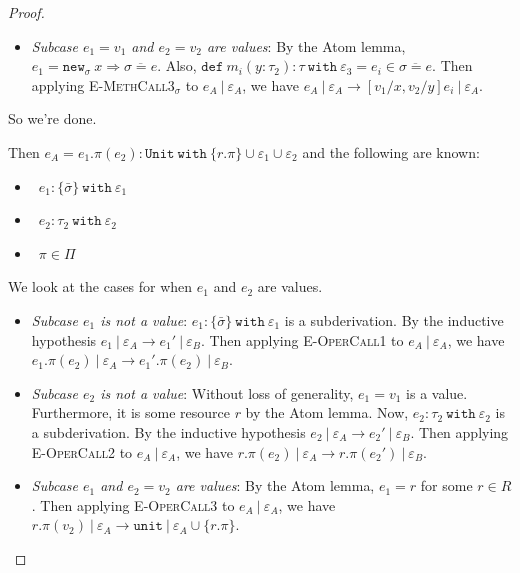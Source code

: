 \documentclass{llncs}
\newcommand{\keywadj}[1]{\mathtt{#1}}
\newcommand{\keyw}[1]{\keywadj{#1}~}
\newcommand{\pcase}[1][]{
  \if\relax\detokenize{#1}\relax
    \def\thiscase{}
  \else
    \def\thiscase{~#1}
  \fi
  \item
}
\begin{document}
\begin{proof}
\begin{pcases}
\begin{itemize}
	\item[] \textit{Subcase $e_1 = v_1$ and $e_2 = v_2$ are values}: By the Atom lemma, $e_1 = \keywadj{new}_{\sigma}~x \Rightarrow \overline{\sigma = e}$. Also, $\keyw{def} m_i(y: \tau_2) : \tau~\keyw{with} \varepsilon_3 = e_i \in \overline{ \sigma = e }$. Then applying \textsc{E-MethCall3$_{\sigma}$} to $e_A~|~\varepsilon_A$, we have $e_A~|~\varepsilon_A \longrightarrow [v_1/x, v_2/y]e_i~|~\varepsilon_A$.
		
\end{itemize}

So we're done.\\

\pcase[\textsc{$\varepsilon$-OperCall}]
Then $e_A = e_1.\pi(e_2) : \keyw{Unit~with} \{ r. \pi \} \cup \varepsilon_1 \cup \varepsilon_2$ and the following are known:
\begin{itemize}
	\item~$e_1 : \{ \bar \sigma \}~\keyw{with} \varepsilon_1$
	\item~$e_2 : \tau_2~\keyw{with} \varepsilon_2$
	\item~$\pi \in \Pi$
\end{itemize}
	We look at the cases for when $e_1$ and $e_2$ are values.
	
\begin{itemize}
	\item[] \textit{Subcase $e_1$ is not a value}: $e_1 : \{ \bar \sigma \}~\keyw{with} \varepsilon_1$ is a subderivation. By the inductive hypothesis $e_1~|~\varepsilon_A \longrightarrow e_1'~|~\varepsilon_B$. Then applying \textsc{E-OperCall1} to $e_A~|~\varepsilon_A$, we have $e_1.\pi(e_2)~|~\varepsilon_A \longrightarrow e_1'.\pi(e_2)~|~\varepsilon_B$. \\
		
	\item[] \textit{Subcase $e_2$ is not a value}: Without loss of generality, $e_1 = v_1$ is a value. Furthermore, it is some resource $r$ by the Atom lemma. Now, $e_2 : \tau_2~\keyw{with} \varepsilon_2$ is a subderivation. By the inductive hypothesis $e_2~|~\varepsilon_A \longrightarrow e_2'~|~\varepsilon_B$. Then applying \textsc{E-OperCall2} to $e_A~|~\varepsilon_A$, we have $r.\pi(e_2)~|~\varepsilon_A \longrightarrow r.\pi(e_2')~|~\varepsilon_B$. \\
	
	\item[] \textit{Subcase $e_1$ and $e_2 = v_2$ are values}: By the Atom lemma, $e_1 = r$ for some $r \in R$. Then applying \textsc{E-OperCall3} to $e_A~|~\varepsilon_A$, we have $r.\pi(v_2)~|~\varepsilon_A \longrightarrow \keywadj{unit}~|~\varepsilon_A \cup \{ r.\pi \}$. \\
	

\end{itemize}
\end{pcases}
\end{proof}
\end{document}
